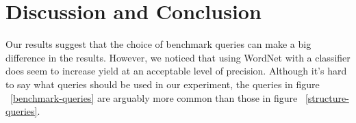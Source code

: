 \documentclass{article}
\begin{document}
\section{Discussion and Conclusion}
Our results suggest that the choice of benchmark queries can make a big difference in the results. However, we noticed that using WordNet with a classifier does seem to increase yield at an acceptable level of precision. Although it's hard to say what queries should be used in our experiment, the queries in figure ~\ref{benchmark-queries} are arguably more common than those in figure ~\ref{structure-queries}.




\end{document}
